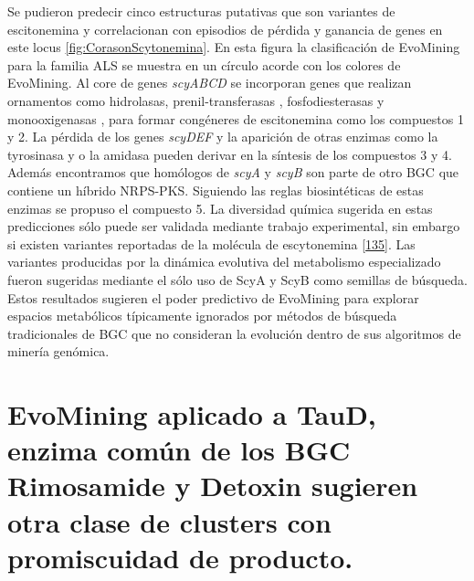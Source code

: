 \documentclass[12pt,twoside]{reedthesis}
\begin{document}
  Se pudieron predecir cinco estructuras putativas que son variantes de
  escitonemina y correlacionan con episodios de pérdida y ganancia de
  genes en este locus \autoref{fig:CorasonScytonemina}. En esta figura la
  clasificación de EvoMining para la familia ALS se muestra en un círculo
  acorde con los colores de EvoMining. Al core de genes \emph{scyABCD} se
  incorporan genes que realizan ornamentos como hidrolasas,
  prenil-transferasas , fosfodiesterasas y monooxigenasas , para formar
  congéneres de escitonemina como los compuestos 1 y 2. La pérdida de los
  genes \emph{scyDEF} y la aparición de otras enzimas como la tyrosinasa y
  o la amidasa pueden derivar en la síntesis de los compuestos 3 y 4.
  Además encontramos que homólogos de \emph{scyA} y \emph{scyB} son parte
  de otro BGC que contiene un híbrido NRPS-PKS. Siguiendo las reglas
  biosintéticas de estas enzimas se propuso el compuesto 5. La diversidad
  química sugerida en estas predicciones sólo puede ser validada mediante
  trabajo experimental, sin embargo si existen variantes reportadas de la
  molécula de escytonemina
  {[}\protect\hyperlink{ref-grant_scytonemin-imine_2013}{135}{]}. Las
  variantes producidas por la dinámica evolutiva del metabolismo
  especializado fueron sugeridas mediante el sólo uso de ScyA y ScyB como
  semillas de búsqueda. Estos resultados sugieren el poder predictivo de
  EvoMining para explorar espacios metabólicos típicamente ignorados por
  métodos de búsqueda tradicionales de BGC que no consideran la evolución
  dentro de sus algoritmos de minería genómica.
  
  \section{EvoMining aplicado a TauD, enzima común de los BGC Rimosamide y
  Detoxin sugieren otra clase de clusters con promiscuidad de
  producto.}\label{evomining-aplicado-a-taud-enzima-comun-de-los-bgc-rimosamide-y-detoxin-sugieren-otra-clase-de-clusters-con-promiscuidad-de-producto.}
  
\end{document}
